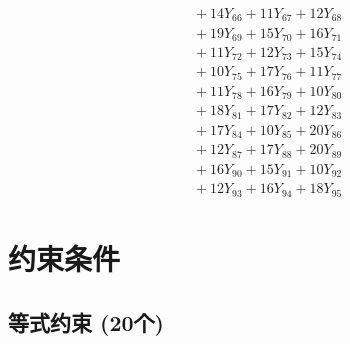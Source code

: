 \documentclass[a4paper,10pt]{article}
\begin{document}
{\begin{align}
&\;  + 14 Y_{66} + 11 Y_{67} + 12 Y_{68} \\[0.3ex]
&\;  + 19 Y_{69} + 15 Y_{70} + 16 Y_{71} \\[0.3ex]
&\;  + 11 Y_{72} + 12 Y_{73} + 15 Y_{74} \\[0.3ex]
&\;  + 10 Y_{75} + 17 Y_{76} + 11 Y_{77} \\[0.3ex]
&\;  + 11 Y_{78} + 16 Y_{79} + 10 Y_{80} \\[0.3ex]
&\;  + 18 Y_{81} + 17 Y_{82} + 12 Y_{83} \\[0.5ex]\allowbreak
&\;  + 17 Y_{84} + 10 Y_{85} + 20 Y_{86} \\[0.3ex]
&\;  + 12 Y_{87} + 17 Y_{88} + 20 Y_{89} \\[0.3ex]
&\;  + 16 Y_{90} + 15 Y_{91} + 10 Y_{92} \\[0.3ex]
&\;  + 12 Y_{93} + 16 Y_{94} + 18 Y_{95}\nonumber
\end{align}
}

\section{约束条件}

\subsection{等式约束 (20个)}
\end{document}

